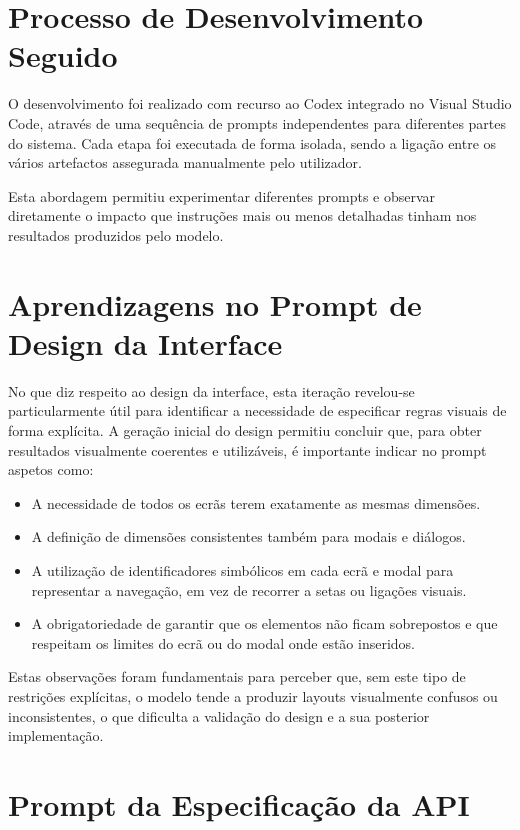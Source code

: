 \section{Processo de Desenvolvimento Seguido}

O desenvolvimento foi realizado com recurso ao Codex integrado no Visual Studio Code, através de uma sequência de prompts independentes para diferentes partes do sistema. Cada etapa foi executada de forma isolada, sendo a ligação entre os vários artefactos assegurada manualmente pelo utilizador.

Esta abordagem permitiu experimentar diferentes prompts e observar diretamente o impacto que instruções mais ou menos detalhadas tinham nos resultados produzidos pelo modelo.

\section{Aprendizagens no Prompt de Design da Interface}

No que diz respeito ao design da interface, esta iteração revelou-se particularmente útil para identificar a necessidade de especificar regras visuais de forma explícita. A geração inicial do design permitiu concluir que, para obter resultados visualmente coerentes e utilizáveis, é importante indicar no prompt aspetos como:

\begin{itemize}
  \item A necessidade de todos os ecrãs terem exatamente as mesmas dimensões.
  \item A definição de dimensões consistentes também para modais e diálogos.
  \item A utilização de identificadores simbólicos em cada ecrã e modal para representar a navegação, em vez de recorrer a setas ou ligações visuais.
  \item A obrigatoriedade de garantir que os elementos não ficam sobrepostos e que respeitam os limites do ecrã ou do modal onde estão inseridos.
\end{itemize}

Estas observações foram fundamentais para perceber que, sem este tipo de restrições explícitas, o modelo tende a produzir layouts visualmente confusos ou inconsistentes, o que dificulta a validação do design e a sua posterior implementação.

\section{Prompt da Especificação da API}

